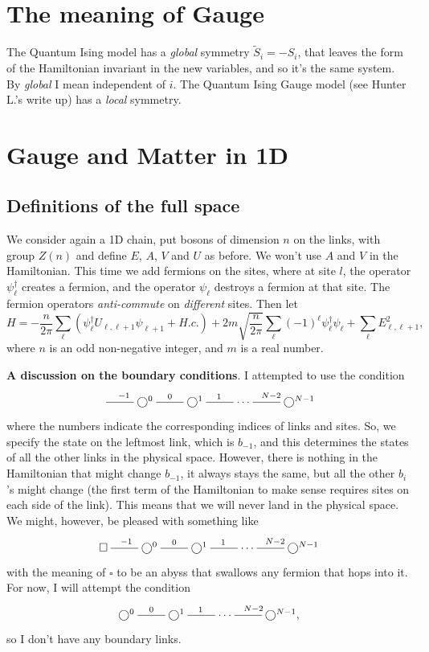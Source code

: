 
%
	
	\section{The meaning of Gauge}
	The Quantum Ising model has a \emph{global} symmetry $\tilde{S}_i = -S_i$, that leaves
	the form of the Hamiltonian invariant in the new variables, and so it's the same system.
	By \emph{global} I mean independent of $i$.
	The Quantum Ising Gauge model (see Hunter L.'s write up) has a \emph{local} symmetry.
	
	\section{Gauge and Matter in 1D}
	\subsection{Definitions of the full space}
	We consider again a 1D chain, put bosons of dimension $n$ on the links, with group $Z(n)$ and
	define $E$, $A$, $V$ and $U$ as before. We won't use $A$ and $V$ in the Hamiltonian.
	This time we add fermions on the sites, where at site $l$, the operator $\psi_\ell^\dagger$
	creates a fermion, and the operator $\psi_\ell$ destroys a fermion at that site.
	The fermion operators \emph{anti-commute} on \emph{different} sites.
	Then let
		\begin{equation}\label{eq:1dQEDLatticeHamiltonian}
	H=-\frac{n}{2\pi} \sum_\ell (\psi_\ell^\dagger U_{\ell,\ell+1}\psi_{\ell+1}+H.c.) + 2m\sqrt{\frac{n}{2\pi}}\sum_\ell (-1)^\ell \psi_\ell^\dagger\psi_\ell+  \sum_{\ell} E_{\ell,\ell+1}^2,		
	\end{equation}
	where $n$ is an odd non-negative integer, and $m$ is a real number.
	
\noindent \textbf{A discussion on the boundary conditions}. I attempted to use the condition
	\[
	\xymatrix{
	\ar@{-}[r]^{-1} & \bigcirc^0 \ar@{-}[r]^{0} &  \bigcirc^1 \ar@{-}[r]^{1} & \cdots & \ar@{-}[l]_{N-2} \bigcirc^{N-1}
	}
	\]
	where the numbers indicate the corresponding indices of links and sites. So, we specify the state on the leftmost link, which is $b_{-1}$, and this determines the states of all the other links in the physical space. However, there is nothing in the Hamiltonian that might change $b_{-1}$, it always stays the same, but all the other $b_i$'s might change (the first term of the Hamiltonian to make sense requires sites on each side of the link). This means that we will never land in the physical space. We might, however, be pleased with something like
		\[
	\xymatrix{
	\square\ar@{-}[r]^{-1} & \bigcirc^0 \ar@{-}[r]^{0} &  \bigcirc^1 \ar@{-}[r]^{1} & \cdots & \ar@{-}[l]_{N-2} \bigcirc^{N-1}
	}
	\]
	with the meaning of $\square$ to be an abyss that swallows any fermion that hops into it. For now, I will attempt the condition
			\[
	\xymatrix{
\bigcirc^0 \ar@{-}[r]^{0} &  \bigcirc^1 \ar@{-}[r]^{1} & \cdots & \ar@{-}[l]_{N-2} \bigcirc^{N-1},
	}
	\]
	so I don't have any boundary links.
	
